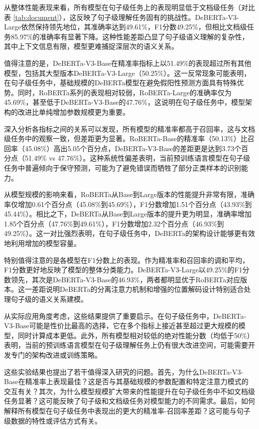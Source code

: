 从整体性能表现来看，所有模型在句子级任务上的表现明显低于文档级任务（对比表 \ref{tab:document}），这反映了句子级理解任务固有的挑战性。DeBERTa-V3-Large依然保持领先地位，其准确率达到49.61\%，F1分数49.25\%，但相比文档级任务85.97\%的准确率有显著下降。这种性能差距凸显了句子级语义理解的复杂性，其中上下文信息有限，模型更难捕捉深层次的语义关系。

值得注意的是，DeBERTa-V3-Base在精准率指标上以51.49\%的表现超过所有其他模型，包括其大型版本DeBERTa-V3-Large（50.25\%）。这一反常现象可能表明，在句子级任务中，基础规模的DeBERTa模型在避免假阳性预测方面具有特殊优势。同时，RoBERTa系列的表现相对较弱，RoBERTa-Large的准确率仅为45.69\%，甚至低于DeBERTa-V3-Base的47.76\%，这说明在句子级任务中，模型架构的改进比单纯增加参数规模更为重要。

深入分析各指标之间的关系可以发现，所有模型的精准率都高于召回率，这与文档级任务中的观察一致，但差距更为显著。RoBERTa-Base的精准率（50.13\%）比召回率（45.08\%）高出5.05个百分点，DeBERTa-V3-Base的差距更是达到3.73个百分点（51.49\% vs 47.76\%）。这种系统性偏差表明，当前预训练语言模型在句子级任务中普遍倾向于保守预测，可能为了避免错误而牺牲了部分正类样本的识别能力。

从模型规模的影响来看，RoBERTa从Base到Large版本的性能提升非常有限，准确率仅增加0.61个百分点（45.08\%到45.69\%），F1分数增加1.51个百分点（43.93\%到45.44\%）。相比之下，DeBERTa从Base到Large版本的提升更为明显，准确率增加1.85个百分点（47.76\%到49.61\%），F1分数增加2.32个百分点（46.93\%到49.25\%）。这一对比强烈表明，在句子级任务中，DeBERTa的架构设计能够更有效地利用增加的模型容量。

特别值得注意的是各模型在F1分数上的表现。作为精准率和召回率的调和平均，F1分数更好地反映了模型的整体分类能力。DeBERTa-V3-Large以49.25\%的F1分数领先，其次是DeBERTa-V3-Base的46.93\%，两者都明显优于RoBERTa对应版本。这一差距说明DeBERTa的分离注意力机制和增强的位置解码设计特别适合处理句子级的语义关系建模。

从实际应用角度考虑，这些结果提供了重要启示。在句子级任务中，DeBERTa-V3-Base可能是性价比最高的选择，它在多个指标上接近甚至超过更大规模的模型，同时计算成本更低。此外，所有模型相对较低的绝对性能分数（均低于50\%）表明，当前的预训练语言模型在句子级理解任务上仍有很大改进空间，可能需要开发专门的架构改进或训练策略。

这些实验结果也提出了若干值得深入研究的问题。首先，为什么DeBERTa-V3-Base在精准率上表现最佳？这是否与其基础规模的参数配置和特定注意力模式的交互有关？其次，为什么模型规模扩大带来的性能提升在句子级任务中不如文档级任务显著？这可能反映了句子级和文档级任务对模型能力的不同需求。最后，如何解释所有模型在句子级任务中表现出的更大的精准率-召回率差距？这可能与句子级数据的特性或评估方式有关。

